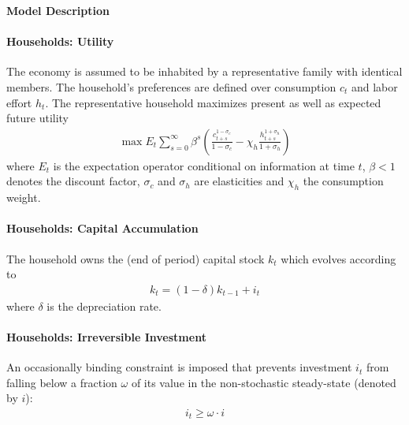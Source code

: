 \documentclass{article}
\begin{document}
\begin{center} \Large \textbf{Model Description} \end{center}

\paragraph{Households: Utility}
The economy is assumed to be inhabited by a representative family with identical members.
The household's preferences are defined over consumption $c_t$
  and labor effort $h_t$.
The representative household maximizes present as well as expected future utility
\begin{align}
	\max E_t \sum_{s=0}^{\infty} \beta^{s} \left( \frac{c_{t+s}^{1-\sigma_c}}{1-\sigma_c} - \chi_h \frac{h_{t+s}^{1+\sigma_h}}{1+\sigma_h} \right)\label{eq:RBCMonopIrrInv.UtilityLifetime}
\end{align}
where $E_t$ is the expectation operator conditional on information at time $t$,
  $\beta <1$ denotes the discount factor,
  $\sigma_c$ and $\sigma_h$ are elasticities and $\chi_h$ the consumption weight.

\paragraph{Households: Capital Accumulation}
The household owns the (end of period) capital stock $k_t$ which evolves according to
\begin{align}
k_t = (1-\delta)k_{t-1} + i_t \label{eq:RBCMonopIrrInv.CapitalAccumulation}
\end{align}
where $\delta$ is the depreciation rate.

\paragraph{Households: Irreversible Investment}
An occasionally binding constraint is imposed that prevents investment $i_t$ from falling below a fraction $\omega$
  of its value in the non-stochastic steady-state (denoted by $i$):
\begin{align}
i_t \geq \omega \cdot i \label{eq:RBCMonopIrrInv.IrrInvest}
\end{align}
\end{document}
